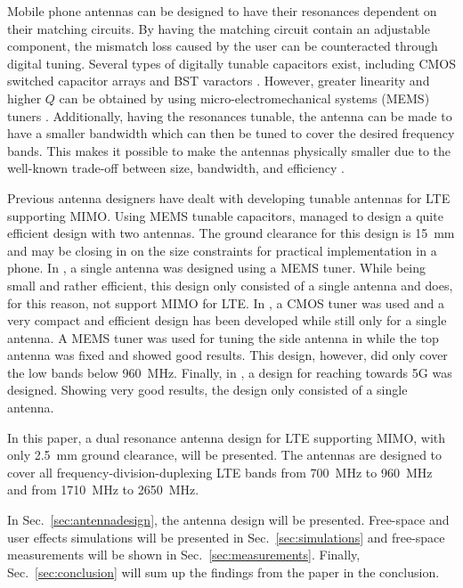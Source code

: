 Mobile phone antennas can be designed to have their resonances dependent on their matching circuits. By having the matching circuit contain an adjustable component, the mismatch loss caused by the user can be counteracted through digital tuning. Several types of digitally tunable capacitors exist, including CMOS switched capacitor arrays and BST varactors \cite{gu2014rf}. However, greater linearity and higher $Q$ can be obtained by using micro-electromechanical systems (MEMS) tuners \cite{gu2014rf}. Additionally, having the resonances tunable, the antenna can be made to have a smaller bandwidth which can then be tuned to cover the desired frequency bands. This makes it possible to make the antennas physically smaller due to the well-known trade-off between size, bandwidth, and efficiency \cite{hilbert2015tradeoff}.

Previous antenna designers have dealt with developing tunable antennas for LTE supporting MIMO. Using MEMS tunable capacitors, \cite{ilvonen2014multiband} managed to design a quite efficient design with two antennas. The ground clearance for this design is \SI{15}{mm} and may be closing in on the size constraints for practical implementation in a phone. In \cite{morris2014tunable}, a single antenna was designed using a MEMS tuner. While being small and rather efficient, this design only consisted of a single antenna and does, for this reason, not support MIMO for LTE. In \cite{xia2015compact}, a CMOS tuner was used and a very compact and efficient design has been developed while still only for a single antenna. A MEMS tuner was used for tuning the side antenna in \cite{tatomirescu2015alternative} while the top antenna was fixed and showed good results. This design, however, did only cover the low bands below \SI{960}{MHz}. Finally, in \cite{trinh2016reconfigurable}, a design for reaching towards 5G was designed. Showing very good results, the design only consisted of a single antenna.

In this paper, a dual resonance antenna design for LTE supporting MIMO, with only \SI{2.5}{mm} ground clearance, will be presented. The antennas are designed to cover all frequency-division-duplexing LTE bands from \SI{700}{MHz} to \SI{960}{MHz} and from \SI{1710}{MHz} to \SI{2650}{MHz}.

In Sec.~\ref{sec:antennadesign}, the antenna design will be presented. Free-space and user effects simulations will be presented in Sec.~\ref{sec:simulations} and free-space measurements will be shown in Sec.~\ref{sec:measurements}. Finally, Sec.~\ref{sec:conclusion} will sum up the findings from the paper in the conclusion.

